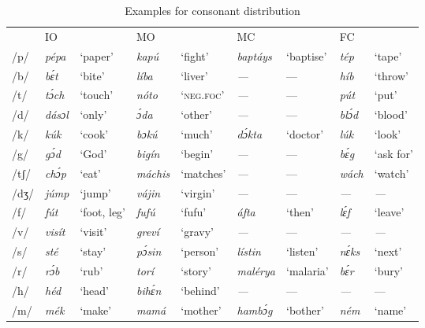 \begin{sidewaystable}
\caption{Examples for consonant distribution}
\label{tab:key:2.6}

\begin{tabularx}{\textwidth}{l lX lX lX lX}
 & \MakeUppercase{io} &  & MO &  & \MakeUppercase{mc} &  & \MakeUppercase{fc} & \\
\lsptoprule
/p/ & \itshape pépa & ‘paper’ & \itshape kapú & ‘fight’ & \itshape baptáys & ‘baptise’ & \itshape tép & ‘tape’\\
/b/ & \itshape bɛ́t & ‘bite’ & \itshape líba & ‘liver’ & \itshape {}--- & {}--- & \itshape híb & ‘throw’\\
/t/ & \itshape tɔ́ch & ‘touch’ & \itshape nóto & ‘\textsc{neg}.\textsc{foc}’ & \itshape {}--- & {}--- & \itshape pút & ‘put’\\
/d/ & \itshape dásɔl & ‘only’ & \itshape ɔ́da & ‘other’ & \itshape {}--- & {}--- & \itshape blɔ́d & ‘blood’\\
/k/ & \itshape kúk & ‘cook’ & \itshape bɔkú & ‘much’ & \itshape dɔ́kta & ‘doctor’ & \itshape lúk & ‘look’\\
/g/ & \itshape gɔ́d & ‘God’ & \itshape bigín & ‘begin’ & \itshape {}--- & {}--- & \itshape bɛ́g & ‘ask for’\\
/tʃ/ & \itshape chɔ́p & ‘eat’ & \itshape máchis & ‘matches’ & \itshape {}--- & {}--- & \itshape wách & ‘watch’\\
/dʒ/ & \itshape júmp & ‘jump’ & \itshape vájin & ‘virgin’ & \itshape {}--- & {}--- & \itshape {}--- & \textit{{}---}\\
/f/ & \itshape fút & ‘foot, leg’ & \itshape fufú & ‘fufu’ & \itshape áfta & ‘then’ & \itshape lɛ́f & ‘leave’\\
/v/ & \itshape visít & ‘visit’ & \itshape greví & ‘gravy’ & \itshape {}--- & {}--- & \itshape \textup{{}---} & \textit{{}---}\\
/s/ & \itshape sté & ‘stay’ & \itshape pɔ́sin & ‘person’ & \itshape lístin & ‘listen’ & \itshape nɛ́ks & ‘next’\\
/r/ & \itshape rɔ́b & ‘rub’ & \itshape torí & ‘story’ & \itshape malérya & ‘malaria’ & \itshape bɛ́r & ‘bury’\\
/h/ & \itshape héd & ‘head’ & \itshape bihɛ́n & ‘behind’ & \itshape {}--- & {}--- & \itshape {}--- & {}---\\
/m/ & \itshape mék & ‘make’ & \itshape mamá & ‘mother’ & \itshape hambɔ́g & ‘bother’ & \itshape ném & ‘name’\\

\end{tabularx}
\end{sidewaystable}
